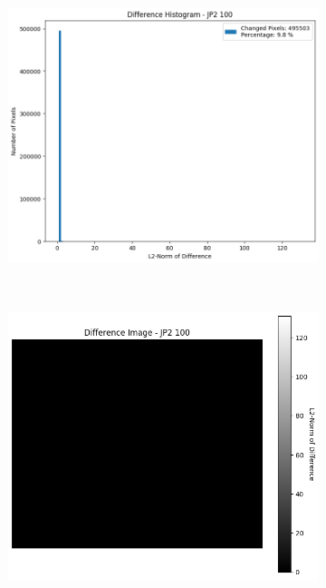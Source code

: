 \begin{figure}[htb]
\begin{subfigure}[b]{0.48\textwidth}
        \includegraphics[width=\textwidth]{doc/thesis/0_figures/compare_quality/set1/jp2_100_diff_histogram.png}
        \caption{}
        \label{fig:img_quality_comp_jp2_100_histo}
    \end{subfigure}
    \\
    \begin{subfigure}[b]{0.48\textwidth}
        \centering
        \includegraphics[width=\textwidth]{doc/thesis/0_figures/compare_quality/set1/jp2_100_diff_heatmap.png}
        \caption{}
        \label{fig:img_quality_comp_jp2_100_diff}

\end{subfigure}
\end{figure}
